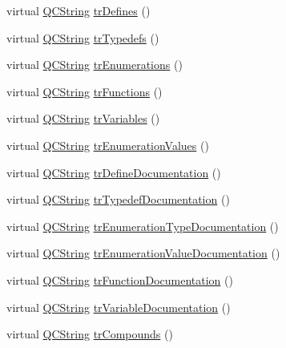 \begin{DoxyCompactItemize}
\item 
virtual \mbox{\hyperlink{class_q_c_string}{Q\+C\+String}} \mbox{\hyperlink{class_translator_norwegian_a530dd3cfaf5ca077cea50df989421779}{tr\+Defines}} ()
\item 
virtual \mbox{\hyperlink{class_q_c_string}{Q\+C\+String}} \mbox{\hyperlink{class_translator_norwegian_a29f0d7815f5545b1acfad460aa478cf2}{tr\+Typedefs}} ()
\item 
virtual \mbox{\hyperlink{class_q_c_string}{Q\+C\+String}} \mbox{\hyperlink{class_translator_norwegian_a6609a383fdb0f2ef8b09391179278228}{tr\+Enumerations}} ()
\item 
virtual \mbox{\hyperlink{class_q_c_string}{Q\+C\+String}} \mbox{\hyperlink{class_translator_norwegian_ae28c16bf5b7efce585aeb78167c7e36a}{tr\+Functions}} ()
\item 
virtual \mbox{\hyperlink{class_q_c_string}{Q\+C\+String}} \mbox{\hyperlink{class_translator_norwegian_a4ff9a3e4beb96de99947fff437bf5030}{tr\+Variables}} ()
\item 
virtual \mbox{\hyperlink{class_q_c_string}{Q\+C\+String}} \mbox{\hyperlink{class_translator_norwegian_a25ce99a57816bd75886f407659c237e3}{tr\+Enumeration\+Values}} ()
\item 
virtual \mbox{\hyperlink{class_q_c_string}{Q\+C\+String}} \mbox{\hyperlink{class_translator_norwegian_ae61cb9a7ba62824659649b33da0dfe0d}{tr\+Define\+Documentation}} ()
\item 
virtual \mbox{\hyperlink{class_q_c_string}{Q\+C\+String}} \mbox{\hyperlink{class_translator_norwegian_ac018e7af9b956f72f75b84c51821ae4a}{tr\+Typedef\+Documentation}} ()
\item 
virtual \mbox{\hyperlink{class_q_c_string}{Q\+C\+String}} \mbox{\hyperlink{class_translator_norwegian_a62cf7f9780edc2581dbf3c73697bfca6}{tr\+Enumeration\+Type\+Documentation}} ()
\item 
virtual \mbox{\hyperlink{class_q_c_string}{Q\+C\+String}} \mbox{\hyperlink{class_translator_norwegian_a8a78fa35b2c327c01b83fc6632a846f8}{tr\+Enumeration\+Value\+Documentation}} ()
\item 
virtual \mbox{\hyperlink{class_q_c_string}{Q\+C\+String}} \mbox{\hyperlink{class_translator_norwegian_a5de6dadf1f0aa1b2b520f42555b87aad}{tr\+Function\+Documentation}} ()
\item 
virtual \mbox{\hyperlink{class_q_c_string}{Q\+C\+String}} \mbox{\hyperlink{class_translator_norwegian_a79c01604daaf2eb75f6a53d45abfed9e}{tr\+Variable\+Documentation}} ()
\item 
virtual \mbox{\hyperlink{class_q_c_string}{Q\+C\+String}} \mbox{\hyperlink{class_translator_norwegian_a78c133664ddcd9b886e4fd65be643e93}{tr\+Compounds}} ()

\end{DoxyCompactItemize}
